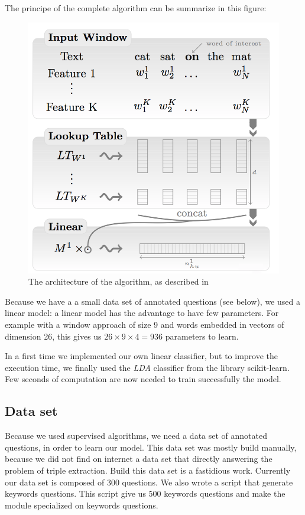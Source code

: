 The principe of the complete algorithm can be summarize in this figure: 

\begin{figure}[!ht]
  \centering
  \caption{The architecture of the algorithm, as described in \cite{collobert}}
  \label{sandalone:model}
    \includegraphics[scale=0.5]{../NLP-standalone-images/model.png}
\end{figure}

Because we have a a small data set of annotated questions (see below), we used a linear model: a linear model has the advantage to have few parameters.
For example with a window approach of size 9 and words embedded in vectors of dimension 26,  this gives us $26\times 9\times 4 = 936$ parameters to learn.

In a first time we implemented our own linear classifier, but to improve the execution time, we finally used the \textit{LDA} classifier from the library scikit-learn. Few seconds of computation are now needed to train successfully the model.

\subsection{Data set}

Because we used supervised algorithms, we need a data set of annotated questions, in order to learn our model.
This data set was mostly build manually, because we did not find on internet a data set that directly answering the problem of triple extraction.
Build this data set is a fastidious work. Currently our data set is composed of 300 questions.
We also wrote a script that generate keywords questions. This script give us 500 keywords questions and make the module specialized on keywords questions.

